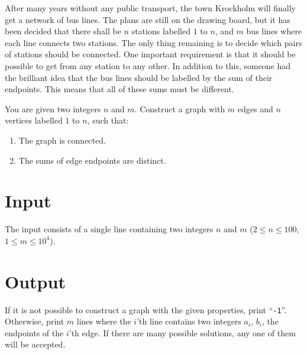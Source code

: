 
\noindent
After many years without any public transport, the town Krockholm will finally get a network
of bus lines. The plans are still on the drawing board, but it has been decided that there shall
be $n$ stations labelled $1$ to $n$, and $m$ bus lines where each line connects two stations.
The only thing remaining is to decide which pairs of stations should be connected. One important
requirement is that it should be possible to get from any station to any other. In addition to this,
someone had the brilliant idea that the bus lines should be labelled by the sum of their endpoints.
This means that all of these sums must be different.

You are given two integers $n$ and $m$. Construct a graph with $m$ edges and $n$ vertices
labelled $1$ to $n$, such that:
\begin{enumerate}
\item The graph is connected.
\item The sums of edge endpoints are distinct.
\end{enumerate}

\section*{Input}

The input consists of a single line containing two integers $n$ and $m$ ($2 \leq n \leq 100$, $1 \leq m \leq 10^4$).

\section*{Output}

If it is not possible to construct a graph with the given properties, print ``\texttt{-1}''.
Otherwise, print $m$ lines where the $i$'th line contains two integers $a_i$, $b_i$, the endpoints of
the $i$'th edge. If there are many possible solutions, any one of them will be accepted.
